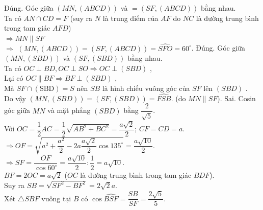 \begin{ex}
{\begin{itemchoice}
{\begin{tikzpicture}[>=stealth,line join=round,line cap=round,font=\footnotesize,scale=0.8]
			\end{tikzpicture}}
			\itemch Đúng. Góc giữa $\left(MN,\left(ABCD\right)\right)$ và $=\left(SF,\left(ABCD\right)\right)$ bằng nhau.\\
			Ta có $AN\cap CD=F$ (suy ra $N$ là trung điểm của $AF$ do $NC$ là đường trung bình trong tam giác $AFD$)\\
			$\Rightarrow MN\parallel SF$\\
			$\Rightarrow $ $\left(MN,\left(ABCD\right)\right)=\left(SF,\left(ABCD\right)\right)=\widehat{SFO}=60^\circ $.
			\itemch Đúng. Góc giữa $\left(MN,\left(SBD\right)\right)$ và $\left(SF,\left(SBD\right)\right)$ bằng nhau.\\
			Ta có $OC\perp BD,OC\perp SO\Rightarrow OC\perp\left(SBD\right)$ ,\\
			Lại có $OC\parallel BF\Rightarrow BF\perp\left(SBD\right)$ ,\\
			Mà $ SF\cap\left(\text{SBD}\right)=S$ nên $SB$ là hình chiếu vuông góc của $SF$ lên $\left(SBD\right)$ .\\
			Do vậy $\left(MN,\left(SBD\right)\right)=\left(SF,\left(SBD\right)\right)=\widehat{FSB}$. (do $ MN\parallel SF$).
			\itemch Sai. Cosin góc giữa $ MN$ và mặt phẳng $\left(SBD\right)$ bằng $\dfrac{2}{\sqrt{5}}$.\\
			Với $OC=\dfrac{1}{2}AC=\dfrac{1}{2}\sqrt{AB^2+BC^2}=\dfrac{a\sqrt{2}}{2}$; $CF=CD=a$.\\
			$\Rightarrow OF=\sqrt{a^2+\dfrac{a^2}{2}-2a\dfrac{a\sqrt{2}}{2}\cos 135^\circ}=\dfrac{a\sqrt{10}}{2}$.\\
			$\Rightarrow SF=\dfrac{OF}{\cos 60^\circ}=\dfrac{a\sqrt{10}}{2}:\dfrac{1}{2}=a\sqrt{10}$.\\
			$BF=2OC=a\sqrt{2}$ ($OC$ là đường trung bình trong tam giác $BDF$).\\
			Suy ra $SB=\sqrt{SF^2-BF^2}=2\sqrt{2}a$.\\
			Xét $\triangle SBF$ vuông tại $ B$ có
			$\cos\widehat{BSF}=\dfrac{SB}{SF}=\dfrac{2\sqrt{5}}{5}$.
		\end{itemchoice}
	}
\end{ex}

